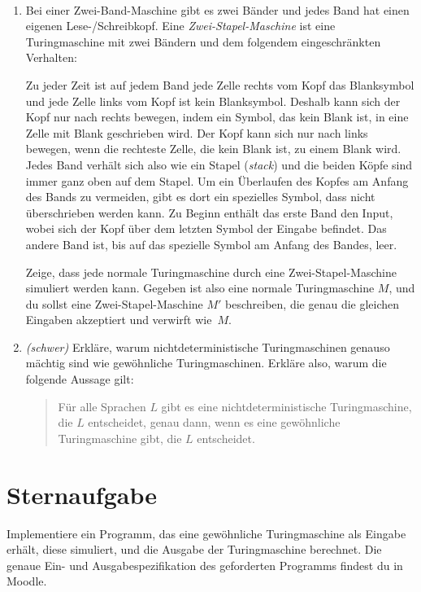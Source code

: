 \documentclass{uebung_cs}
\begin{document}
\begin{exercise}[Turingmaschinen V]\
	\begin{enumerate}
		\item Bei einer Zwei-Band-Maschine gibt es zwei Bänder und jedes Band hat einen eigenen Lese-/Schreibkopf.
		Eine \emph{Zwei-Stapel-Maschine} ist eine Turingmaschine mit zwei Bändern und dem folgendem eingeschränkten Verhalten:
		
		Zu jeder Zeit ist auf jedem Band jede Zelle rechts vom Kopf das Blanksymbol und jede Zelle links vom Kopf ist kein Blanksymbol. Deshalb kann sich der Kopf nur nach rechts bewegen, indem ein Symbol, das kein Blank ist, in eine Zelle mit Blank geschrieben wird. Der Kopf kann sich nur nach links bewegen, wenn die rechteste Zelle, die kein Blank ist, zu einem Blank wird. Jedes Band verhält sich also wie ein Stapel (\emph{stack}) und die beiden Köpfe sind immer ganz oben auf dem Stapel. Um ein Überlaufen des Kopfes am Anfang des Bands zu vermeiden, gibt es dort ein spezielles Symbol, dass nicht überschrieben werden kann. Zu Beginn enthält das erste Band den Input, wobei sich der Kopf über dem letzten Symbol der Eingabe befindet. Das andere Band ist, bis auf das spezielle Symbol am Anfang des Bandes, leer.
		
		Zeige, dass jede normale Turingmaschine durch eine Zwei-Stapel-Maschine simuliert werden kann. Gegeben ist also eine normale Turingmaschine $M$, und du sollst eine Zwei-Stapel-Maschine $M'$ beschreiben, die genau die gleichen Eingaben akzeptiert und verwirft wie~$M$.
		
		\item \emph{(schwer)} Erkläre, warum nichtdeterministische Turingmaschinen genauso mächtig sind wie gewöhnliche Turingmaschinen.
    Erkläre also, warum die folgende Aussage gilt:
		\begin{quote}
			Für alle Sprachen $L$ gibt es eine nichtdeterministische Turingmaschine, die $L$ entscheidet, genau dann, wenn es eine gewöhnliche Turingmaschine gibt, die $L$ entscheidet.
		\end{quote}
	\end{enumerate}
\end{exercise}


\section*{Sternaufgabe}

\begin{exercise}[\emoji{star}: Turingmaschine simulieren (Coderunner)]
  Implementiere ein Programm, das eine gewöhnliche Turingmaschine als Eingabe erhält, diese simuliert, und die Ausgabe der Turingmaschine berechnet. Die genaue Ein- und Ausgabespezifikation des geforderten Programms findest du in Moodle.
\end{exercise}
\end{document}
